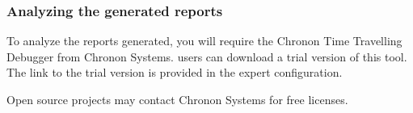 \subsubsection{Analyzing the generated reports}
\label{TasksChrononTools}
To analyze the reports generated, you will require the Chronon Time Travelling Debugger from Chronon Systems. \app{} users can download a trial version of this tool. The link to the trial version is provided in the expert \gdaut{} configuration.

Open source projects may contact Chronon Systems for free licenses. 


